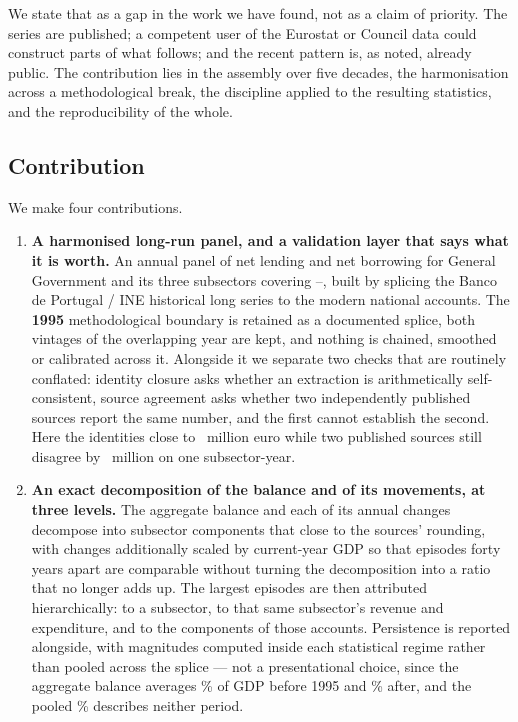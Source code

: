 We state that as a gap in the work we have found, not as a claim of priority. The
series are published; a competent user of the Eurostat or Council data could
construct parts of what follows; and the recent pattern is, as noted, already public.
The contribution lies in the assembly over five decades, the harmonisation across a
methodological break, the discipline applied to the resulting statistics, and the
reproducibility of the whole.

\subsection{Contribution}

We make four contributions.

\begin{enumerate}
\item \textbf{A harmonised long-run panel, and a validation layer that says what it is
worth.} An annual panel of net lending and net borrowing for General Government and its
three subsectors covering \PanelStart--\PanelEnd, built by splicing the Banco de
Portugal / INE historical long series to the modern national accounts. The
\textbf{1995} methodological boundary is retained as a documented splice, both vintages
of the overlapping year are kept, and nothing is chained, smoothed or calibrated across
it. Alongside it we separate two checks that are routinely conflated: identity closure
asks whether an extraction is arithmetically self-consistent, source agreement asks
whether two independently published sources report the same number, and the first cannot
establish the second. Here the identities close to \MaxClosureResidual\ million euro
while two published sources still disagree by \MaxSourceDisagreement\ million on one
subsector-year.

\item \textbf{An exact decomposition of the balance and of its movements, at three
levels.} The aggregate balance and each of its annual changes decompose into subsector
components that close to the sources' rounding, with changes additionally scaled by
current-year GDP so that episodes forty years apart are comparable without turning the
decomposition into a ratio that no longer adds up. The largest episodes are then
attributed hierarchically: to a subsector, to that same subsector's revenue and
expenditure, and to the components of those accounts. Persistence is reported alongside,
with magnitudes computed inside each statistical regime rather than pooled across the
splice --- not a presentational choice, since the aggregate balance averages
\GgMeanHistorical\% of GDP before 1995 and \GgMeanModern\% after, and the pooled
\GgMeanPooled\% describes neither period.


\end{enumerate}
